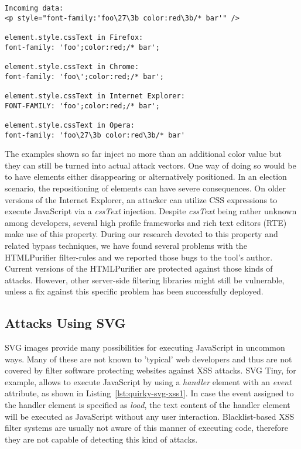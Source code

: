 \begin{lstlisting}[label=lst:csstest-attack,caption=Example for cssText decoding behavior,captionpos=b]
Incoming data:
<p style="font-family:'foo\27\3b color:red\3b/* bar'" />

element.style.cssText in Firefox: 
font-family: 'foo';color:red;/* bar';

element.style.cssText in Chrome:
font-family: 'foo\';color:red;/* bar';

element.style.cssText in Internet Explorer:
FONT-FAMILY: 'foo';color:red;/* bar';

element.style.cssText in Opera:
font-family: 'foo\27\3b color:red\3b/* bar'
\end{lstlisting}

     The examples shown so far inject no more than an additional color value but they can still be turned into actual attack vectors. One way of doing so would be to have elements either disappearing or alternatively positioned. In an election scenario, the repositioning of elements can have severe consequences. On older versions of the Internet Explorer, an attacker can utilize CSS expressions to execute JavaScript via a \textit{cssText} injection. Despite \textit{cssText} being rather unknown among developers, several high profile frameworks and rich text editors (RTE) make use of this property. During our research devoted to this property and related bypass techniques, we have found several problems with the HTMLPurifier filter-rules and we reported those bugs to the tool's author. Current versions of the HTMLPurifier are protected against those kinds of attacks. However, other server-side filtering libraries might still be vulnerable, unless a fix against this specific problem has been successfully 
deployed. 

    \subsection{Attacks Using SVG}
    \label{subsubsec:5.4.10.attacks_using_svg}

    SVG images provide many possibilities for executing Java\-Script in uncommon ways. Many of these are not known to 'typical' web developers and thus are not covered by filter software protecting websites against XSS attacks. SVG Tiny, for example, allows to execute JavaScript by using a \textit{handler} element with an \textit{event} attribute, as shown in Listing~\ref{lst:quirky-svg-xss1}. In case the event assigned to the handler element is specified as \textit{load}, the text content of the handler element will be executed as JavaScript without any user interaction. Blacklist-based XSS filter systems are usually not aware of this manner of executing code, therefore they are not capable of detecting this kind of attacks.\\

